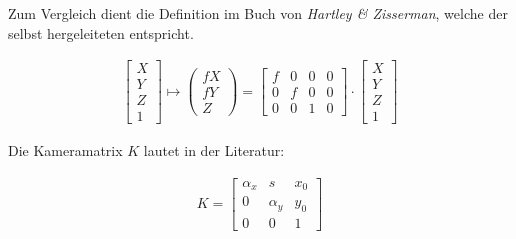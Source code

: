 		Zum Vergleich dient die Definition im Buch von \textit{Hartley \& Zisserman}\cite{HZ}, welche der selbst hergeleiteten entspricht.
		
		
					\begin{gather}
		\begin{bmatrix}
		X\\Y\\Z\\1
		\end{bmatrix} \mapsto
		\begin{pmatrix}
		f X\\ f Y\\ Z
		\end{pmatrix}
		=
		\begin{bmatrix}
		f&0&0&0\\
		0&f&0&0\\
		0&0&1&0
		\end{bmatrix}
		\cdot
		\begin{bmatrix}
		X\\Y\\Z\\1
		\end{bmatrix}
		\end{gather}		
		
		
		Die Kameramatrix $K$ lautet in der Literatur\cite{HZ}:
		
		\begin{gather}
		K=\begin{bmatrix}
		\alpha_x&s&x_{0}\\
		0&\alpha_y&y_{0}\\
		0&0&1
		\end{bmatrix}
		\end{gather}
		
